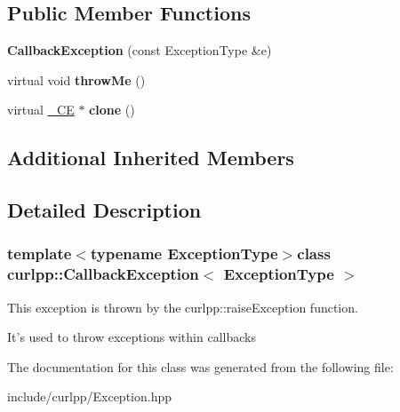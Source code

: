 \subsection*{Public Member Functions}
\begin{DoxyCompactItemize}
\item 
\hypertarget{classcurlpp_1_1CallbackException_a9594d36ed3921cafcd50b1186ba9a31d}{{\bfseries Callback\-Exception} (const Exception\-Type \&e)}\label{classcurlpp_1_1CallbackException_a9594d36ed3921cafcd50b1186ba9a31d}

\item 
\hypertarget{classcurlpp_1_1CallbackException_a2d29d21f7a15e8bd785269d1309c9cee}{virtual void {\bfseries throw\-Me} ()}\label{classcurlpp_1_1CallbackException_a2d29d21f7a15e8bd785269d1309c9cee}

\item 
\hypertarget{classcurlpp_1_1CallbackException_a64eb25a75d04ee77cc0664885305de6a}{virtual \hyperlink{classcurlpp_1_1CallbackException}{\-\_\-\-C\-E} $\ast$ {\bfseries clone} ()}\label{classcurlpp_1_1CallbackException_a64eb25a75d04ee77cc0664885305de6a}

\end{DoxyCompactItemize}
\subsection*{Additional Inherited Members}


\subsection{Detailed Description}
\subsubsection*{template$<$typename Exception\-Type$>$class curlpp\-::\-Callback\-Exception$<$ Exception\-Type $>$}

This exception is thrown by the curlpp\-::raise\-Exception function. 

It's used to throw exceptions within callbacks 

The documentation for this class was generated from the following file\-:\begin{DoxyCompactItemize}
\item 
include/curlpp/Exception.\-hpp\end{DoxyCompactItemize}
